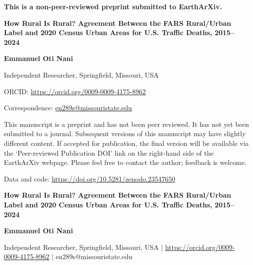 \documentclass[12pt]{article}
\begin{document}
\begin{titlepage}\thispagestyle{fancy}\centering
{\large\bfseries This is a non-peer-reviewed preprint submitted to EarthArXiv.\par}\vspace{1.2cm}
{\Large\bfseries How Rural Is Rural? Agreement Between the FARS Rural/Urban Label and 2020 Census Urban Areas for U.S. Traffic Deaths, 2015--2024\par}\vspace{0.8cm}
{\bfseries Emmanuel Oti Nani}\,\par
Independent Researcher, Springfield, Missouri, USA\par
ORCID: \url{https://orcid.org/0009-0009-4175-8962}\par
Correspondence: \href{mailto:en289s@missouristate.edu}{en289s@missouristate.edu}\par\vspace{1.2cm}
\begin{minipage}{0.85\textwidth}\centering
This manuscript is a preprint and has not been peer reviewed. It has not yet been submitted to a journal.
Subsequent versions of this manuscript may have slightly different content. If accepted for publication, the
final version will be available via the `Peer-reviewed Publication DOI' link on the right-hand side of the
EarthArXiv webpage. Please feel free to contact the author; feedback is welcome.\end{minipage}\par\vspace{0.8cm}
Data and code: \url{https://doi.org/10.5281/zenodo.23547650}\par
\end{titlepage}\setcounter{page}{2}
\linenumbers\onehalfspacing
\begin{center}{\large\bfseries How Rural Is Rural? Agreement Between the FARS Rural/Urban Label and 2020 Census Urban Areas for U.S. Traffic Deaths, 2015--2024\par}\vspace{0.3cm}
{\bfseries Emmanuel Oti Nani}\par{\small Independent Researcher, Springfield, Missouri, USA $\mid$ \url{https://orcid.org/0009-0009-4175-8962} $\mid$ en289s@missouristate.edu\par}\end{center}
\end{document}
